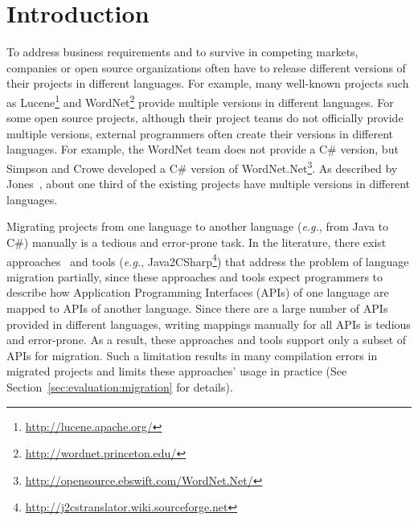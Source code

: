 \section{Introduction}
\label{sec:introduction}

To address business requirements
and to survive in competing markets, companies or open source
organizations often have to release different versions of their
projects in different languages. For example, many well-known
projects such as
Lucene\footnote{\url{http://lucene.apache.org/}}
and WordNet\footnote{\url{http://wordnet.princeton.edu/}} provide
multiple versions in different languages. For some open source
projects, although their project teams do not officially provide
multiple versions, external programmers often create their versions
in different languages. For example, the WordNet team does not
provide a C\# version, but Simpson and Crowe developed a C\# version
of
WordNet.Net\footnote{\url{http://opensource.ebswift.com/WordNet.Net/}}.
As described by Jones~\cite{jones1998estimating}, about
one third of the existing projects have multiple versions in
different languages.


Migrating projects from one language to another language
(\emph{e.g.}, from Java to C\#) manually is a tedious and
error-prone task. In the literature, there exist
approaches~\cite{mossienko2003automated, yasumatsu1995spice} and tools (\emph{e.g.}, Java2CSharp\footnote{\url{http://j2cstranslator.wiki.sourceforge.net}}) that address the problem of language
migration partially, since these approaches and tools expect programmers to
describe how Application Programming Interfaces (APIs) of one language are mapped to APIs of another
language.  Since there are a large number of APIs provided in different languages,
writing mappings manually for all APIs is tedious and error-prone.
As a result, these approaches and tools
support only a subset of APIs for migration. Such a limitation
results in many compilation errors in migrated projects and limits
these approaches' usage in practice (See Section~\ref{sec:evaluation:migration} for details).

